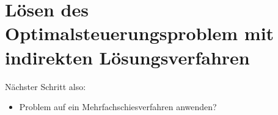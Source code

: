 \chapter{Lösen des Optimalsteuerungsproblem mit indirekten Lösungsverfahren}

Nächster Schritt also:
\begin{itemize}
\item Problem auf ein Mehrfachschiesverfahren anwenden?
\end{itemize}


















